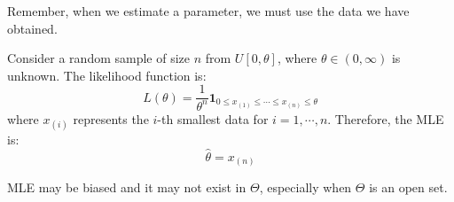 \documentclass{huhtakm-template-book-v2}
\begin{document}
\begin{rem}
	Remember, when we estimate a parameter, we must use the data we have obtained.
\end{rem}
\begin{eg}
	Consider a random sample of size $n$ from $U[0,\theta]$, where $\theta\in(0,\infty)$ is unknown. The likelihood function is:
	\begin{equation*}
		L(\theta)=\frac{1}{\theta^{n}}\mathbf{1}_{0\leq x_{(1)}\leq\cdots\leq x_{(n)}\leq\theta}
	\end{equation*}
	where $x_{(i)}$ represents the $i$-th smallest data for $i=1,\cdots,n$. Therefore, the MLE is:
	\begin{equation*}
		\hat{\theta}=x_{(n)}
	\end{equation*}
\end{eg}
\begin{rem}
	MLE may be biased and it may not exist in $\Theta$, especially when $\Theta$ is an open set.
\end{rem}
\end{document}
